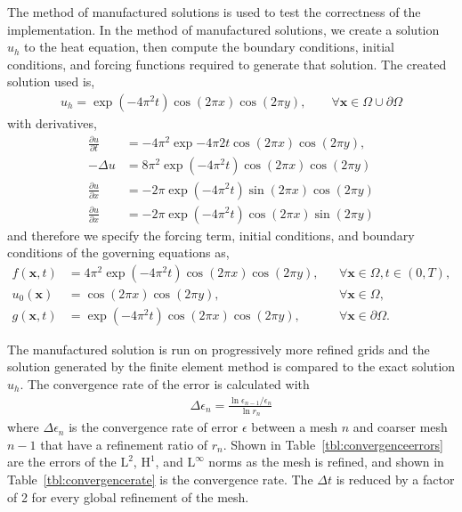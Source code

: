\documentclass{article}
\begin{document}
The method of manufactured solutions is used to test the correctness of
the implementation. In the method of manufactured solutions, we create a
solution \(u_h\) to the heat equation, then compute the boundary
conditions, initial conditions, and forcing functions required to
generate that solution. The created solution used is,
\begin{align}
  u_h = \exp\left( -4\pi^2t \right) \cos(2 \pi x) \cos(2 \pi y), \qquad \forall \boldsymbol{x} \in \Omega \cup \partial\Omega
\end{align}
with derivatives,
\begin{align}
  \frac{\partial u}{\partial t} &= -4 \pi^2 \exp{-4\pi 2t} \cos(2 \pi x)\cos(2 \pi y), \\
  -\Delta u &= 8 \pi^2 \exp\left(-4\pi^2t\right)\cos(2 \pi x)\cos(2 \pi y) \\
  \frac{\partial u}{\partial x} &= -2\pi \exp\left(-4\pi^2t\right)\sin(2\pi x)\cos(2\pi y) \\
 \frac{\partial u}{\partial x} &= -2 \pi \exp\left(-4\pi^2t\right)\cos(2\pi x)\sin(2\pi y)
\end{align}
and therefore we specify the forcing term, initial conditions, and boundary
conditions of the governing equations as,
\begin{align}
  f(\boldsymbol{x},t) &= 4 \pi^2 \exp\left(-4\pi^2t\right)\cos(2 \pi x)\cos(2 \pi y), &&\forall\boldsymbol{x}\in\Omega,t\in\left( 0,T \right), \\
  u_0(\boldsymbol{x}) &= \cos(2 \pi x)\cos(2\pi y), &&\forall \boldsymbol{x}\in\Omega, \\
  g(\boldsymbol{x},t) &= \exp\left(-4\pi^2t\right)\cos(2 \pi x)\cos(2\pi y), &&\forall \boldsymbol{x} \in \partial\Omega.
\end{align}

The manufactured solution is run on progressively more refined grids and
the solution generated by the finite element method is compared to the
exact solution \(u_h\). The convergence rate of the error is calculated
with
\begin{align}
  \Delta \epsilon_n = \frac{\ln{\epsilon_{n-1}/\epsilon_{n}}}{\ln{r_n}}
\end{align}
where \(\Delta \epsilon_n\) is the convergence rate of error \(\epsilon\) between a mesh \(n\) and coarser mesh \(n-1\) that have a refinement ratio of \(r_n\).
Shown in Table~\ref{tbl:convergenceerrors} are the errors of the $\textrm{L}^2$, $\textrm{H}^1$, and $\textrm{L}^\infty$ norms as the mesh is refined, and shown in Table~\ref{tbl:convergencerate} is the convergence rate.
The \(\Delta t\) is reduced by a factor of 2 for every global refinement of the mesh.
\end{document}

